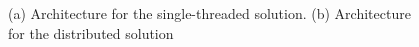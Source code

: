 {%
%
%
%


\begin{figure}[ht]
\caption{(a) Architecture for the single-threaded solution. (b) Architecture for the distributed solution}
\label{fig:arch_impl}
\end{figure}

}
